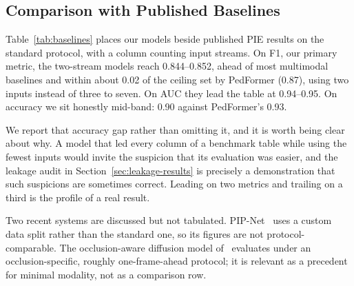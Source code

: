 \documentclass[mti,article,submit,moreauthors]{Definitions/mdpi}
\begin{document}
\subsection{Comparison with Published Baselines}
\label{sec:baselines}

Table~\ref{tab:baselines} places our models beside published PIE results on the standard protocol, with a column counting input streams. On F1, our primary metric, the two-stream models reach 0.844--0.852, ahead of most multimodal baselines and within about 0.02 of the ceiling set by PedFormer (0.87), using two inputs instead of three to seven. On AUC they lead the table at 0.94--0.95. On accuracy we sit honestly mid-band: 0.90 against PedFormer's 0.93.

We report that accuracy gap rather than omitting it, and it is worth being clear about why. A model that led every column of a benchmark table while using the fewest inputs would invite the suspicion that its evaluation was easier, and the leakage audit in Section~\ref{sec:leakage-results} is precisely a demonstration that such suspicions are sometimes correct. Leading on two metrics and trailing on a third is the profile of a real result.

Two recent systems are discussed but not tabulated. PIP-Net~\citep{azarmi2025pipnet} uses a custom data split rather than the standard one, so its figures are not protocol-comparable. The occlusion-aware diffusion model of~\citet{liu2025occlusion} evaluates under an occlusion-specific, roughly one-frame-ahead protocol; it is relevant as a precedent for minimal modality, not as a comparison row.
\end{document}
